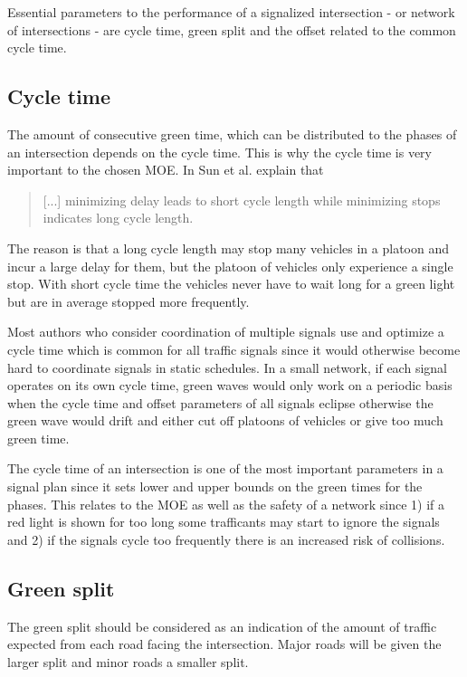 \label{theproblem}
Essential parameters to the performance of a signalized intersection - or network of intersections - are cycle time, green split and the offset related to the common cycle time.

\subsection*{Cycle time}
The amount of consecutive green time, which can be distributed to the phases of an intersection depends on the cycle time. This is why the cycle time is very important to the chosen MOE. In \cite{41} Sun et al. explain that 

\begin{quote}[...] minimizing delay leads to short cycle length while minimizing stops indicates long cycle length.
\end{quote}

The reason is that a long cycle length may stop many vehicles in a platoon and incur a large delay for them, but the platoon of vehicles only experience a single stop. With short cycle time the vehicles never have to wait long for a green light but are in average stopped more frequently.

Most authors who consider coordination of multiple signals use and optimize a cycle time which is common for all traffic signals since it would otherwise become hard to coordinate signals in static schedules. In a small network, if each signal operates on its own cycle time, green waves would only work on a periodic basis when the cycle time and offset parameters of all signals eclipse otherwise the green wave would drift and either cut off platoons of vehicles or give too much green time.

The cycle time of an intersection is one of the most important parameters in a signal plan since it sets  lower and upper bounds on the green times for the phases. This relates to the MOE as well as the safety of a network since 1) if a red light is shown for too long some trafficants may start to ignore the signals and 2) if the signals cycle too frequently there is an increased risk of collisions.

\subsection*{Green split}
The green split should be considered as an indication of the amount of traffic expected from each road facing the intersection. Major roads will be given the larger split and minor roads a smaller split.


